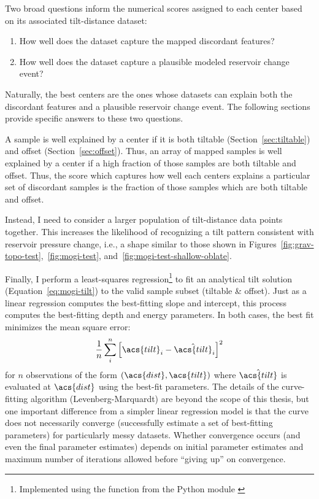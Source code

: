 Two broad questions inform the numerical scores assigned to each center based on its associated tilt-distance dataset:
\begin{enumerate}
    \item How well does the dataset capture the mapped discordant features?
    \item How well does the dataset capture a plausible modeled reservoir change event?
\end{enumerate}
Naturally, the best centers are the ones whose datasets can explain both the discordant features and a plausible reservoir change event. The following sections provide specific answers to these two questions.

A sample is well explained by a center if it is both tiltable (Section~\ref{sec:tiltable}) and offset (Section~\ref{sec:offset}). Thus, an array of mapped samples is well explained by a center if a high fraction of those samples are both tiltable and offset. Thus, the score which captures how well each centers explains a particular set of discordant samples is the fraction of those samples which are both tiltable and offset.

Instead, I need to consider a larger population of tilt-distance data points together. This increases the likelihood of recognizing a tilt pattern consistent with reservoir pressure change, i.e., a shape similar to those shown in Figures~\ref{fig:grav-topo-test},~\ref{fig:mogi-test}, and~\ref{fig:mogi-test-shallow-oblate}.

Finally, I perform a least-squares regression\footnote{Implemented using the  function from the  Python module \parencite{2020SciPy-NMeth}} to fit an analytical tilt solution (Equation~\ref{eq:mogi-tilt}) to the valid sample subset (tiltable \& offset). Just as a linear regression computes the best-fitting slope and intercept, this process computes the best-fitting depth and energy parameters. In both cases, the best fit minimizes the mean square error:
\begin{equation}
    \frac{1}{n}\sum_{i}^{n}{\left[\acs{tilt}_i-\hat{\acs{tilt}}_i\right]}^2\label{eq:mse}
\end{equation}
for $n$ observations of the form $(\acs{dist}, \acs{tilt})$ where $\hat{\acs{tilt}}$ is evaluated at $\acs{dist}$ using the best-fit parameters. The details of the curve-fitting algorithm (Levenberg-Marquardt) are beyond the scope of this thesis, but one important difference from a simpler linear regression model is that the curve does not necessarily converge (successfully estimate a set of best-fitting parameters) for particularly messy datasets. Whether convergence occurs (and even the final parameter estimates) depends on initial parameter estimates and maximum number of iterations allowed before ``giving up'' on convergence.


